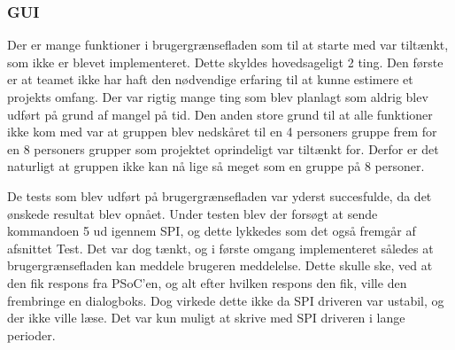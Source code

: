 \subsubsection{GUI}

Der er mange funktioner i brugergrænsefladen som til at starte med var tiltænkt, som ikke er blevet implementeret. Dette skyldes hovedsageligt 2 ting. Den første er at teamet ikke har haft den nødvendige erfaring til at kunne estimere et projekts omfang. Der var rigtig mange ting som blev planlagt som aldrig blev udført på grund af mangel på tid. Den anden store grund til at alle funktioner ikke kom med var at gruppen blev nedskåret til en 4 personers gruppe frem for en 8 personers grupper som projektet oprindeligt var tiltænkt for. Derfor er det naturligt at gruppen ikke kan nå lige så meget som en gruppe på 8 personer.

De tests som blev udført på brugergrænsefladen var yderst succesfulde, da det ønskede resultat blev opnået. Under testen blev der forsøgt at sende kommandoen 5 ud igennem SPI, og dette lykkedes som det også fremgår af afsnittet Test.  Det var dog tænkt, og i første omgang implementeret således at brugergrænsefladen kan meddele brugeren meddelelse. Dette skulle ske, ved at den fik respons fra PSoC’en, og alt efter hvilken respons den fik, ville den frembringe en dialogboks. Dog virkede dette ikke da SPI driveren var ustabil, og der ikke ville læse. Det var kun muligt at skrive med SPI driveren i lange perioder.

